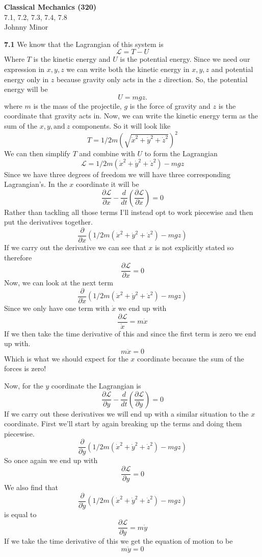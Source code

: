 \documentclass[11pt, leqno]{article}
\begin{document}
{\centering
\textbf{Classical Mechanics (320)} \\  
7.1, 7.2, 7.3, 7.4, 7.8 \\
Johnny Minor \\
}

\noindent \textbf{7.1}
We know that the Lagrangian of this system is 
$$
\mathcal{L}= T-U
$$
Where $T$ is the kinetic energy and $U$ is the potential energy. Since we need our expression in $x,y,z$ we can write both the kinetic energy in $x,y,z$ and potential energy only in $z$ because gravity only acts in the $z$ direction. So, the potential energy will be
$$
U = mgz.
$$ 
where $m$ is the mass of the projectile, $g$ is the force of gravity and $z$ is the coordinate that gravity acts in. 
Now, we can write the kinetic energy term as the sum of the $x,y, \mathrm{and} \ z$ components. So it will look like 
$$
T = 1/2 m \left(\sqrt{\dot{x}^2 + \dot{y}^2 + \dot{z}^2}\right)^2
$$
We can then simplify $T$ and combine with $U$ to form the Lagrangian
$$
\mathcal{L}  = 1/2 m \left(\dot{x}^2 + \dot{y}^2 + \dot{z}^2\right) - mgz 
$$
Since we have three degrees of freedom we will have three corresponding Lagrangian's. In the $x$ coordinate it will be 
$$
\frac{\partial \mathcal{L}}{\partial x} - \frac{d}{dt}\left(\frac{\partial\mathcal{L}}{\partial \dot{x}}\right) = 0
$$
Rather than tackling all those terms I'll instead opt to work piecewise and then put the derivatives together. 
$$
\frac{\partial}{\partial x}\left(1/2 m \left(\dot{x}^2 + \dot{y}^2 + \dot{z}^2\right) - mgz \right) 
$$
If we carry out the derivative we can see that $x$ is not explicitly stated so therefore 
$$ 
\frac{\partial \mathcal{L}}{\partial x} = 0
$$
Now, we can look at the next term 
$$
\frac{\partial}{\partial \dot{x}}\left( 1/2 m \left(\dot{x}^2 + \dot{y}^2 + \dot{z}^2\right) - mgz \right)
$$
Since we only have one term with $\dot{x}$ we end up with 
$$
\frac{\partial \mathcal{L}}{\dot{x}} = m \dot{x}
$$
If we then take the time derivative of this and since the first term is zero we end up with. 
$$
m \ddot{x} = 0
$$
Which is what we should expect for the $x$ coordinate because the sum of the forces is zero! 

\bigskip

\noindent Now, for the $y$ coordinate the Lagrangian is 
$$
\frac{\partial \mathcal{L}}{\partial y} - \frac{d}{dt}\left(\frac{\partial\mathcal{L}}{\partial \dot{y}}\right) = 0
$$
If we carry out these derivatives we will end up with a similar situation to the $x$ coordinate. First we'll start by again breaking up the terms and doing them piecewise. 
$$
\frac{\partial}{\partial y}\left(1/2 m(\dot{x}^2 + \dot{y}^2 + \dot{z}^2) - mgz \right)
$$
So once again we end up with 
$$
\frac{\partial \mathcal{L}}{\partial y} = 0 
$$
We also find that 
$$
\frac{\partial}{\partial \dot{y}}\left(1/2 m(\dot{x}^2 + \dot{y}^2 + \dot{z}^2) - mgz \right)
$$
is equal to 
$$
\frac{\partial \mathcal{L}}{\partial \dot{y}} = m\dot{y}
$$
If we take the time derivative of this we get the equation of motion to be 
$$
m\ddot{y} = 0
$$
\end{document}

